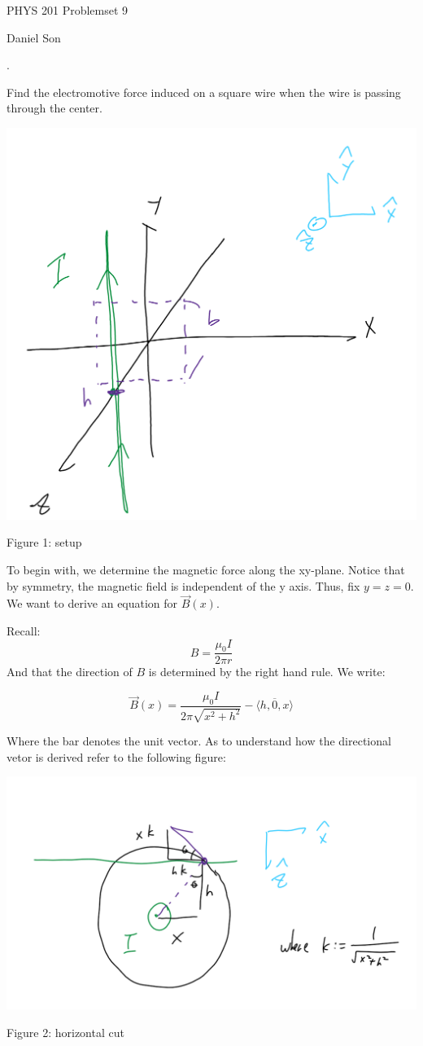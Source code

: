 \documentclass{article}
\def\<{{\langle}}
\def\>{{\rangle}}
\newcounter{problemcnt}
\newcommand{\nProblem}[1]{
    \vspace{5mm}
    \noindent
    \setcounter{problemcnt}{#1}
    \arabic{problemcnt}. 
}
\begin{document}
\begin{center}
\LARGE
PHYS 201 Problemset 9

\Large
Daniel Son
\end{center}

\normalsize

\nProblem{1}
Find the electromotive force induced 
on a square wire when the wire is passing 
through the center. 

\begin{center}
\includegraphics[width = .5\linewidth]{Q1_setup.png}

Figure 1: setup
\end{center}

To begin with, we determine the magnetic force 
along the xy-plane. Notice that by symmetry, 
the magnetic field is independent of the y 
axis. Thus, fix $y = z = 0$. We want to 
derive an equation for $\vec{B}(x)$. 

Recall:
\[
    B = 
    \frac{\mu_0I}
    {2\pi r}
\]
And that the direction of $B$ is determined 
by the right hand rule. We write:

\[
    \vec{B}(x) = 
    \frac{\mu_0 I}
    {2\pi \sqrt{x^2+h^2}}
    -\overline{{\<h, 0, x\>}}
\]

Where the bar denotes the unit vector. 
As to understand how the directional vetor is derived 
refer to the following figure:

\begin{center}
\includegraphics[width = .5\linewidth]{Q1_cut.png}

Figure 2: horizontal cut
\end{center}
\end{document}
